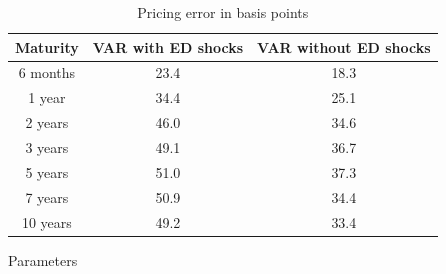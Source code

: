 \documentclass{article}
\numberwithin{equation}{section}
\begin{document}
\begin{table}
\begin{center}
\begin{tabular}{|c|c|c|}
    \hline
    \textbf{Maturity} & \textbf{VAR with ED shocks} & \textbf{VAR without ED
    shocks}\\ \hline
    6 months  & 23.4 & 18.3 \\ \hline
    1 year    & 34.4 & 25.1 \\ \hline
    2 years   & 46.0 & 34.6 \\ \hline
    3 years   & 49.1 & 36.7 \\ \hline
    5 years   & 51.0 & 37.3 \\ \hline
    7 years   & 50.9 & 34.4 \\ \hline
    10 years  & 49.2 & 33.4 \\ \hline
\end{tabular}
\end{center}
\label{tab:2}
\caption{Pricing error in basis points}
\end{table}

Parameters
\end{document}
